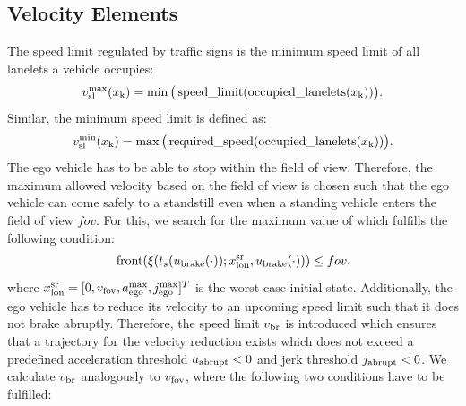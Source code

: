 \subsection{Velocity Elements}
The speed limit regulated by traffic signs is the minimum speed limit of all lanelets a vehicle occupies:
\begin{align*}
\begin{split}
v_\text{sl}^\text{max}(x_\text{k}) = \min\big(\operatorname*{speed\_limit}(\mathtt{\operatorname*{occupied\_lanelets}}(x_\text{k})) \big).
\end{split}
\end{align*}
Similar, the minimum speed limit is defined as:
\begin{align*}
\begin{split}
v_\text{sl}^\text{min}(x_\text{k}) = \max\big(\operatorname*{required\_speed}(\mathtt{\operatorname*{occupied\_lanelets}}(x_\text{k}))\big).
\end{split}
\end{align*}
The ego vehicle has to be able to stop within the field of view. Therefore, the maximum allowed velocity based on the field of view \speedLimitFOV is chosen such that the ego vehicle can come safely to a standstill even when a standing vehicle enters the field of view $fov$. For this, we search for the maximum value of \speedLimitFOV which fulfills the following condition: 
\begin{align*}
\begin{split}
& \operatorname*{front}(\xi(t_{s}(u_\mathrm{brake}(\cdot));x_\mathrm{lon}^\mathrm{sr},u_\mathrm{brake}(\cdot))) \leq fov, \\
\end{split}
\end{align*}
where $x_\mathrm{lon}^\mathrm{sr} = [0,v_\text{fov},a_\text{ego}^\text{max},j_\text{ego}^\text{max}]^T$ is the worst-case initial state.
Additionally, the ego vehicle has to reduce its velocity to an upcoming speed limit such that it does not brake abruptly. 
Therefore, the speed limit $v_\text{br}$ is introduced which ensures that a trajectory for the velocity reduction exists which does not exceed a predefined acceleration threshold $a_\text{abrupt}<0$ and jerk threshold $j_\text{abrupt}<0$. We calculate $v_\text{br}$ analogously to $v_\text{fov}$, where the following two conditions have to be fulfilled:
